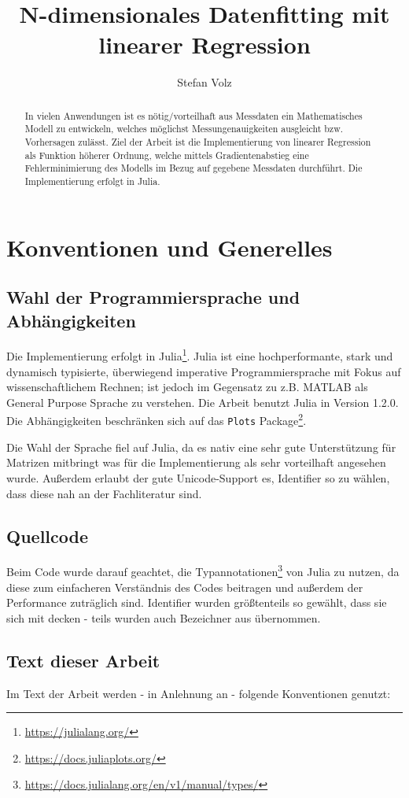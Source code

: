 \documentclass{article}
\title{ N-dimensionales Datenfitting mit linearer Regression  }
\author{
  Stefan Volz
}
\theoremstyle{plain} %
\theoremstyle{definition} %
\begin{document}
\begin{abstract}
  In vielen Anwendungen ist es nötig/vorteilhaft aus Messdaten ein Mathematisches Modell zu entwickeln, welches möglichst Messungenauigkeiten ausgleicht bzw. Vorhersagen zulässt. Ziel der Arbeit ist die Implementierung von linearer Regression als Funktion höherer Ordnung, welche mittels Gradientenabstieg eine Fehlerminimierung des Modells im Bezug auf gegebene Messdaten durchführt. Die Implementierung erfolgt in Julia.
\end{abstract}

\maketitle
\section{Konventionen und Generelles}
\subsection{Wahl der Programmiersprache und Abhängigkeiten}
Die Implementierung erfolgt in Julia\footnote{\url{https://julialang.org/}}. Julia ist eine hochperformante, stark und dynamisch typisierte, überwiegend imperative Programmiersprache mit Fokus auf wissenschaftlichem Rechnen; ist jedoch im Gegensatz zu z.B. MATLAB als General Purpose Sprache zu verstehen. Die Arbeit benutzt Julia in Version 1.2.0. Die Abhängigkeiten beschränken sich auf das \texttt{Plots} Package\footnote{\url{https://docs.juliaplots.org/}}.

Die Wahl der Sprache fiel auf Julia, da es nativ eine sehr gute Unterstützung für Matrizen mitbringt was für die Implementierung als sehr vorteilhaft angesehen wurde. Außerdem erlaubt der gute Unicode-Support es, Identifier so zu wählen, dass diese nah an der Fachliteratur sind.

\subsection{Quellcode}
Beim Code wurde darauf geachtet, die Typannotationen\footnote{\url{https://docs.julialang.org/en/v1/manual/types/}} von Julia zu nutzen, da diese zum einfacheren Verständnis des Codes beitragen und außerdem der Performance zuträglich sind.
Identifier wurden größtenteils so gewählt, dass sie sich mit \cite{Bishop} decken - teils wurden auch Bezeichner aus \cite{Lippe} übernommen.

\subsection{Text dieser Arbeit}
Im Text der Arbeit werden - in Anlehnung an \cite{Bishop} - folgende Konventionen genutzt:
\end{document}
